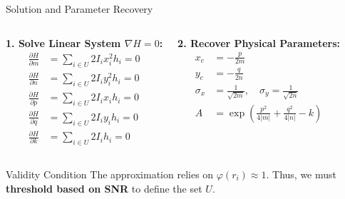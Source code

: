 \begin{frame}{Solution and Parameter Recovery}
    \begin{columns}[T]
        \textbf{1. Solve Linear System $\nabla H = 0$:}
        \scriptsize
        \begin{align*}
            \frac{\partial H}{\partial m} &= \sum_{i \in U} 2 I_i x_i^2 h_i = 0 \\
            \frac{\partial H}{\partial n} &= \sum_{i \in U} 2 I_i y_i^2 h_i = 0 \\
            \frac{\partial H}{\partial p} &= \sum_{i \in U} 2 I_i x_i h_i = 0 \\
            \frac{\partial H}{\partial q} &= \sum_{i \in U} 2 I_i y_i h_i = 0 \\
            \frac{\partial H}{\partial k} &= \sum_{i \in U} 2 I_i h_i = 0
        \end{align*}
        
        \textbf{2. Recover Physical Parameters:}
        \scriptsize
        \begin{align*}
            x_c &= - \frac{p}{2m} \\[1em]
            y_c &= - \frac{q}{2n} \\[1em]
            \sigma_x &= \frac{1}{\sqrt{2m}}, \quad \sigma_y = \frac{1}{\sqrt{2n}} \\[1em]
            A &= \exp\left( \frac{p^2}{4|m|} + \frac{q^2}{4|n|} - k \right)
        \end{align*}
    \end{columns}
    
    \vspace{0.2cm}
    \begin{block}{Validity Condition}
        The approximation relies on $\varphi(r_i) \approx 1$. Thus, we must \textbf{threshold based on SNR} to define the set $U$.
    \end{block}
\end{frame}

